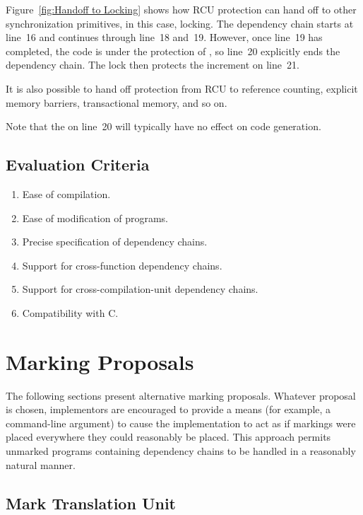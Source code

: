 \documentclass[letterpaper,twocolumn,10pt]{article}
\begin{document}
Figure~\ref{fig:Handoff to Locking}
shows how RCU protection can hand off to other synchronization
primitives, in this case, locking.
The dependency chain starts at line~16 and continues through line~18
and~19.
However, once line~19 has completed, the code is under the protection
of , so line~20 explicitly ends the dependency chain.
The lock then protects the increment on line~21.

It is also possible to hand off protection from RCU to reference counting,
explicit memory barriers, transactional memory, and so on.

Note that the  on line~20 will typically have
no effect on code generation.

\subsection{Evaluation Criteria}
\label{sec:Evaluation Criteria}

\begin{enumerate}
\item	Ease of compilation.
\item	Ease of modification of programs.
\item	Precise specification of dependency chains.
\item	Support for cross-function dependency chains.
\item	Support for cross-compilation-unit dependency chains.
\item	Compatibility with C.
\end{enumerate}

\section{Marking Proposals}
\label{sec:Marking Proposals}

The following sections present alternative marking proposals.
Whatever proposal is chosen, implementors are encouraged to provide
a means (for example, a command-line argument) to cause the
implementation to act as if markings were placed everywhere they
could reasonably be placed.
This approach permits unmarked programs containing dependency chains
to be handled in a reasonably natural manner.

\subsection{Mark Translation Unit}
\label{sec:Mark Translation Unit}
\end{document}
